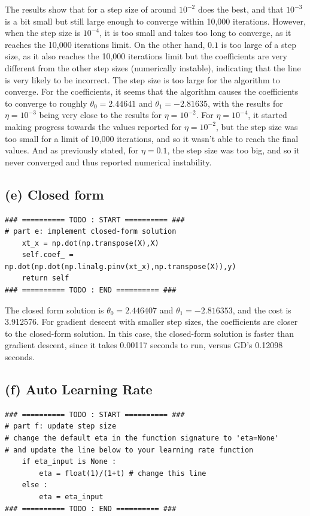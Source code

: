 \documentclass[11pt]{article}
\newcommand{\sol}[1]{{\bf{\color{magenta}{{Solution:}}}}}
\begin{document}
The results show that for a step size of around $10^{-2}$ does the best, and that $10^{-3}$ is a bit small but still large enough to converge within 10,000 iterations. However, when the step size is $10^{-4}$, it is too small and takes too long to converge, as it reaches the 10,000 iterations limit. On the other hand, $0.1$ is too large of a step size, as it also reaches the 10,000 iterations limit but the coefficients are very different from the other step sizes (numerically instable), indicating that the line is very likely to be incorrect. The step size is too large for the algorithm to converge. For the coefficients, it seems that the algorithm causes the coefficients to converge to roughly $\theta_{0}=2.44641$ and $\theta_{1}=-2.81635$, with the results for $\eta=10^{-3}$ being very close to the results for $\eta=10^{-2}$. For $\eta=10^{-4}$, it started making progress towards the values reported for $\eta=10^{-2}$, but the step size was too small for a limit of 10,000 iterations, and so it wasn't able to reach the final values. And as previously stated, for $\eta=0.1$, the step size was too big, and so it never converged and thus reported numerical instability.

\subsection{(e) Closed form}
\sol x
\begin{lstlisting}
### ========== TODO : START ========== ###
# part e: implement closed-form solution
    xt_x = np.dot(np.transpose(X),X)
    self.coef_ = np.dot(np.dot(np.linalg.pinv(xt_x),np.transpose(X)),y)
    return self
### ========== TODO : END ========== ###
\end{lstlisting}

The closed form solution is $\theta_{0}=2.446407$ and $\theta_{1}=-2.816353$, and the cost is 3.912576. For gradient descent with smaller step sizes, the coefficients are closer to the closed-form solution. In this case, the closed-form solution is faster than gradient descent, since it takes 0.00117 seconds to run, versus GD's 0.12098 seconds.

\subsection{(f) Auto Learning Rate}
\sol x 
\begin{lstlisting}
### ========== TODO : START ========== ###
# part f: update step size
# change the default eta in the function signature to 'eta=None'
# and update the line below to your learning rate function
    if eta_input is None :
        eta = float(1)/(1+t) # change this line
    else :
        eta = eta_input
### ========== TODO : END ========== ###
\end{lstlisting}
\end{document}
